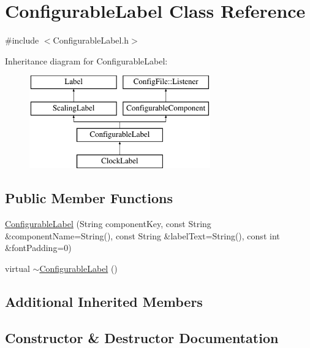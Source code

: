 \hypertarget{classConfigurableLabel}{}\section{Configurable\+Label Class Reference}
\label{classConfigurableLabel}


{\ttfamily \#include $<$Configurable\+Label.\+h$>$}

Inheritance diagram for Configurable\+Label\+:\begin{figure}[H]
\begin{center}
\leavevmode
\includegraphics[height=4.000000cm]{classConfigurableLabel}
\end{center}
\end{figure}
\subsection*{Public Member Functions}
\begin{DoxyCompactItemize}
\item 
\mbox{\hyperlink{classConfigurableLabel_a66ab1fba38f850fc23da9a451e2b6b49}{Configurable\+Label}} (String component\+Key, const String \&component\+Name=String(), const String \&label\+Text=String(), const int \&font\+Padding=0)
\item 
virtual \mbox{\hyperlink{classConfigurableLabel_a5b6f02328cc8ebae1d5018228c6605f8}{$\sim$\+Configurable\+Label}} ()
\end{DoxyCompactItemize}
\subsection*{Additional Inherited Members}


\subsection{Constructor \& Destructor Documentation}
\mbox{\label{classConfigurableLabel_a66ab1fba38f850fc23da9a451e2b6b49}} 
